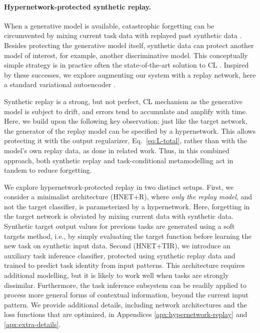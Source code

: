 \documentclass{article}
\begin{document}
\paragraph{Hypernetwork-protected synthetic replay.} When a generative model is available, catastrophic forgetting can be circumvented by mixing current task data with replayed past synthetic data \citep[for recent work see][]{shin_continual_2017,wu_memory_2018}. Besides protecting the generative model itself, synthetic data can protect another model of interest, for example, another discriminative model. This conceptually simple strategy is in practice often the state-of-the-art solution to CL \citep{van_de_ven_three_2019}. Inspired by these successes, we explore augmenting our system with a replay network, here a standard variational autoencoder \citep[VAE;][]{kingma_auto-encoding_2014} \citep[but see Appendix \ref{apx:qualitative-replay-experiments} for experiments with a generative adversarial network,][]{goodfellow2014generative}.

Synthetic replay is a strong, but not perfect, CL mechanism as the generative model is subject to drift, and errors tend to accumulate and amplify with time. Here, we build upon the following key observation: just like the target network, the generator of the replay model can be specified by a hypernetwork. This allows protecting it with the output regularizer, Eq.~\ref{eq:L-total}, rather than with the model's own replay data, as done in related work. Thus, in this combined approach, both synthetic replay and task-conditional metamodelling act in tandem to reduce forgetting.

We explore hypernetwork-protected replay in two distinct setups. First, we consider a minimalist architecture (HNET+R), where \emph{only the replay model}, and not the target classifier, is parameterized by a hypernetwork. Here, forgetting in the target network is obviated by mixing current data with synthetic data. Synthetic target output values for previous tasks are generated using a soft targets method, i.e., by simply evaluating the target function before learning the new task on synthetic input data. Second (HNET+TIR), we introduce an auxiliary task inference classifier, protected using synthetic replay data and trained to predict task identity from input patterns. This architecture requires additional modelling, but it is likely to work well when tasks are strongly dissimilar. Furthermore, the task inference subsystem can be readily applied to process more general forms of contextual information, beyond the current input pattern. We provide additional details, including network architectures and the loss functions that are optimized, in Appendices \ref{apx:hypernetwork-replay} and \ref{apx:extra-details}.
\end{document}
